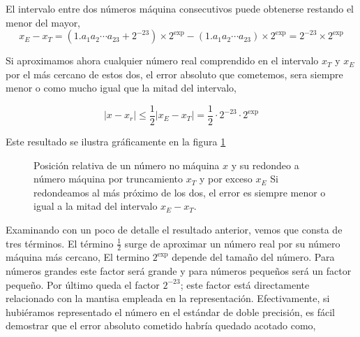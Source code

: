 El intervalo entre dos números máquina consecutivos puede obtenerse restando el menor del mayor,
\begin{equation*}
x_E-x_T= (1.a_1a_2\cdots a_{23}+2^{-23})\times2^\text{exp}- (1.a_1a_2\cdots a_{23})\times2^{\text{exp}}=2^{-23}\times 2^\text{exp}
\end{equation*}

Si aproximamos ahora cualquier número real comprendido en el intervalo $x_T$ y $x_E$ por el más cercano de estos dos, el error absoluto que cometemos, sera siempre menor o como mucho igual que la mitad del intervalo,

\begin{equation*}
\vert x-x_r \vert \leq \frac{1}{2}\vert x_E-x_T \vert= \frac{1}{2}\cdot 2^{-23}\cdot 2^\text{exp}
\end{equation*}

Este resultado se ilustra gráficamente en la figura 	\ref{fig:errorred}

\begin{figure}[h]
\centering
{}
\caption{Posición relativa de un número no máquina $x$ y su redondeo a número máquina por truncamiento $x_T$ y por exceso $x_E$ Si redondeamos al más próximo de los dos, el error es siempre menor o igual a la mitad del intervalo $x_E-x_T$.}
\label{fig:errorred}
\end{figure} 

Examinando con un poco de detalle el resultado anterior, vemos que consta de tres términos. El término $\frac{1}{2}$ surge de aproximar un número real por su número máquina más cercano, El termino $2^\text{exp}$ depende del tamaño del número. Para números grandes este factor será grande y para números pequeños será un factor pequeño. Por último queda el factor $2^{-23}$;  este factor está directamente relacionado con la mantisa empleada en la representación. Efectivamente, si hubiéramos  representado el número en el estándar de doble precisión, es fácil demostrar que el error absoluto cometido habría quedado acotado como,

